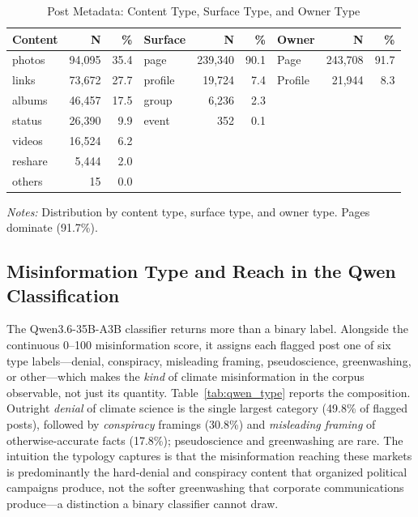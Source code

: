 \documentclass{article}
\theoremstyle{plain}
\begin{document}
\begin{table}[!ht]
\centering
\caption{Post Metadata: Content Type, Surface Type, and Owner Type}
\label{tab:panel_n}
\begin{threeparttable}
\begin{tabularx}{\textwidth}{l R R | l R R | l R R}
\toprule
Content & N & \% & Surface & N & \% & Owner & N & \% \\
\midrule
photos & 94,095 & 35.4 & page & 239,340 & 90.1 & Page & 243,708 & 91.7 \\
links & 73,672 & 27.7 & profile & 19,724 & 7.4 & Profile & 21,944 & 8.3 \\
albums & 46,457 & 17.5 & group & 6,236 & 2.3 & & & \\
status & 26,390 & 9.9 & event & 352 & 0.1 & & & \\
videos & 16,524 & 6.2 & & & & & & \\
reshare & 5,444 & 2.0 & & & & & & \\
others & 15 & 0.0 & & & & & & \\
\bottomrule
\end{tabularx}
\begin{tablenotes}\small
\item \textit{Notes:} Distribution by content type, surface type, and owner type. Pages dominate (91.7\%).
\end{tablenotes}
\end{threeparttable}
\end{table}

\subsection{Misinformation Type and Reach in the Qwen Classification}
\label{sec:firmday_corpus_intuition}

The Qwen3.6-35B-A3B classifier returns more than a binary label. Alongside the continuous 0--100 misinformation score, it assigns each flagged post one of six type labels---denial, conspiracy, misleading framing, pseudoscience, greenwashing, or other---which makes the \emph{kind} of climate misinformation in the corpus observable, not just its quantity. Table~\ref{tab:qwen_type} reports the composition. Outright \emph{denial} of climate science is the single largest category (49.8\% of flagged posts), followed by \emph{conspiracy} framings (30.8\%) and \emph{misleading framing} of otherwise-accurate facts (17.8\%); pseudoscience and greenwashing are rare. The intuition the typology captures is that the misinformation reaching these markets is predominantly the hard-denial and conspiracy content that organized political campaigns produce, not the softer greenwashing that corporate communications produce---a distinction a binary classifier cannot draw.
\end{document}
